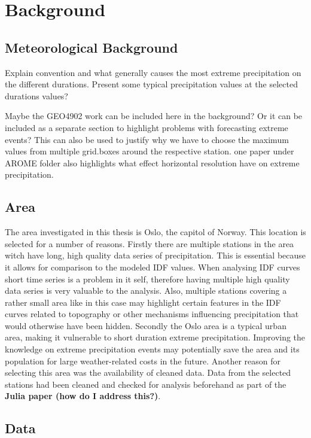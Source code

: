 \section{Background}
\label{sec:background}

\subsection{Meteorological Background}

Explain convention and what generally causes the most extreme precipitation on the different durations. Present some typical precipitation values at the selected durations values?

Maybe the GEO4902 work can be included here in the background? Or it can be included as a separate section to highlight problems with forecasting extreme events? This can also be used to justify why we have to choose the maximum values from multiple grid.boxes around the respective station.   
one paper under AROME folder also highlights what effect horizontal resolution have on extreme precipitation. 

\subsection{Area}

The area investigated in this thesis is Oslo, the capitol of Norway. This location is selected for a number of reasons. Firstly there are multiple stations in the area witch have long, high quality data series of precipitation. This is essential because it allows for comparison to the modeled IDF values. When analysing IDF curves short time series is a problem in it self, therefore having multiple high quality data series is very valuable to the analysis. Also, multiple stations covering a rather small area like in this case may highlight certain features in the IDF curves related to topography or other mechanisms influencing precipitation that would otherwise have been hidden. Secondly the Oslo area is a typical urban area, making it vulnerable to short duration extreme precipitation. Improving the knowledge on extreme precipitation events may potentially save the area and its population for large weather-related costs in the future. Another reason for selecting this area was the availability of cleaned data. Data from the selected stations had been cleaned and checked for analysis beforehand as part of the \textbf{Julia paper (how do I address this?)}. 

\subsection{Data}
